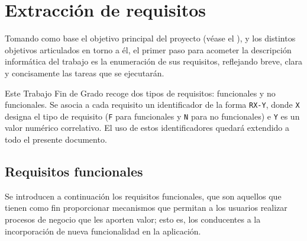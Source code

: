 \section{Extracción de requisitos}
\label{sec:requisitos}
Tomando como base el objetivo principal del proyecto (véase el ), y los distintos objetivos articulados en torno a él, el primer paso para acometer la descripción informática del trabajo es la enumeración de sus requisitos, reflejando breve, clara y concisamente las tareas que se ejecutarán.

Este Trabajo Fin de Grado recoge dos tipos de requisitos: funcionales y no funcionales. Se asocia a cada requisito un identificador de la forma \texttt{RX-Y}, donde \texttt{X} designa el tipo de requisito (\texttt{F} para funcionales y \texttt{N} para no funcionales) e \texttt{Y} es un valor numérico correlativo. El uso de estos identificadores quedará extendido a todo el presente documento.

\subsection{Requisitos funcionales}
\label{subsec:listaReqsFuncionales}
Se introducen a continuación los requisitos funcionales, que son aquellos que tienen como fin proporcionar mecanismos que permitan a los usuarios realizar procesos de negocio que les aporten valor; esto es, los conducentes a la incorporación de nueva funcionalidad en la aplicación.

